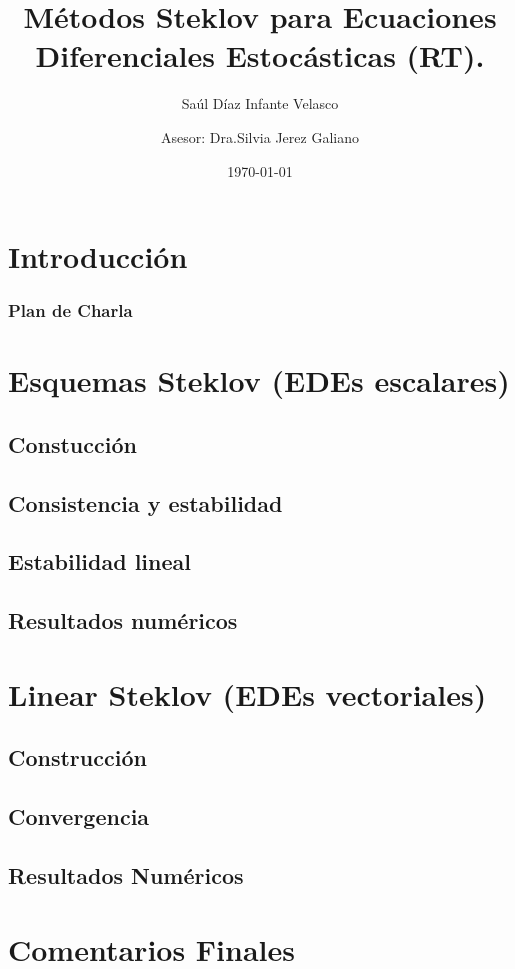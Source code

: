 \documentclass[spanish,10pt,xcolor=dvipsnames,table]{beamer}
\title{Métodos Steklov para Ecuaciones Diferenciales Estocásticas {\tiny(RT)}.}
\author[]{Sa\'ul D\'iaz Infante Velasco \and Asesor: Dra.Silvia Jerez Galiano}
\institute{CIMAT A.C.}
\date\today
\theoremstyle{plain} %
\theoremstyle{definition}
\begin{document}
	\frame{\titlepage \vspace{-0.5cm}}
	\section*{Introducci\'on}
	
	\begin{frame}
		\frametitle{Plan de Charla}
		\tableofcontents[pausesections]
	\end{frame}
	\section{Esquemas Steklov (EDEs escalares)}
	\subsection{Constucci\'on}
	
	\subsection{Consistencia y estabilidad}
	
	\subsection{Estabilidad lineal}
	
	\subsection{Resultados numéricos}
	
	\section{Linear Steklov (EDEs vectoriales)}
	\subsection{Construcci\'on}
	
	\subsection{Convergencia}
	
	\subsection{Resultados Numéricos}
	
	\section{Comentarios Finales}
\end{document}
